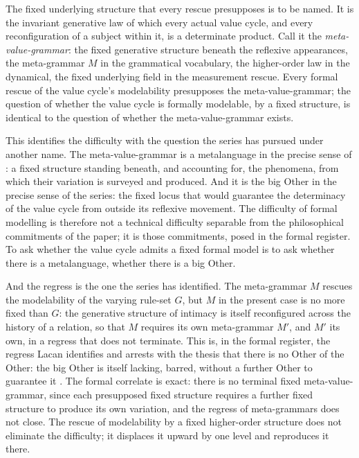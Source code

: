 The fixed underlying structure that every rescue presupposes is to be named. It is the invariant generative law of which every actual value cycle, and every reconfiguration of a subject within it, is a determinate product. Call it the \emph{meta-value-grammar}: the fixed generative structure beneath the reflexive appearances, the meta-grammar $M$ in the grammatical vocabulary, the higher-order law in the dynamical, the fixed underlying field in the measurement rescue. Every formal rescue of the value cycle's modelability presupposes the meta-value-grammar; the question of whether the value cycle is formally modelable, by a fixed structure, is identical to the question of whether the meta-value-grammar exists.

This identifies the difficulty with the question the series has pursued under another name. The meta-value-grammar is a metalanguage in the precise sense of : a fixed structure standing beneath, and accounting for, the phenomena, from which their variation is surveyed and produced. And it is the big Other in the precise sense of the series: the fixed locus that would guarantee the determinacy of the value cycle from outside its reflexive movement. The difficulty of formal modelling is therefore not a technical difficulty separable from the philosophical commitments of the paper; it is those commitments, posed in the formal register. To ask whether the value cycle admits a fixed formal model is to ask whether there is a metalanguage, whether there is a big Other.

And the regress is the one the series has identified. The meta-grammar $M$ rescues the modelability of the varying rule-set $G$, but $M$ in the present case is no more fixed than $G$: the generative structure of intimacy is itself reconfigured across the history of a relation, so that $M$ requires its own meta-grammar $M'$, and $M'$ its own, in a regress that does not terminate. This is, in the formal register, the regress Lacan identifies and arrests with the thesis that there is no Other of the Other: the big Other is itself lacking, barred, without a further Other to guarantee it \parencite{lacan_no_other,fink1995,evans1996}. The formal correlate is exact: there is no terminal fixed meta-value-grammar, since each presupposed fixed structure requires a further fixed structure to produce its own variation, and the regress of meta-grammars does not close. The rescue of modelability by a fixed higher-order structure does not eliminate the difficulty; it displaces it upward by one level and reproduces it there.

